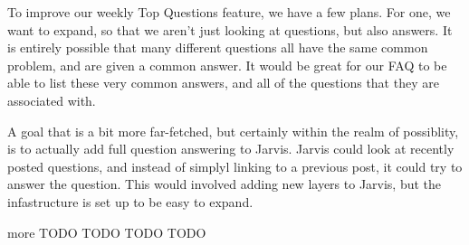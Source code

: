 \documentclass[sigconf]{acmart}
\begin{document}
To improve our weekly Top Questions feature, we have a few plans. For one, we want to expand, so that we aren't just looking at questions, but also answers. It is entirely possible that many different questions all have the same common problem, and are given a common answer. It would be great for our FAQ to be able to list these very common answers, and all of the questions that they are associated with.

A goal that is a bit more far-fetched, but certainly within the realm of possiblity, is to actually add full question answering to Jarvis. Jarvis could look at recently posted questions, and instead of simplyl linking to a previous post, it could try to answer the question. This would involved adding new layers to Jarvis, but the infastructure is set up to be easy to expand.

more TODO TODO TODO TODO




 
\end{document}
